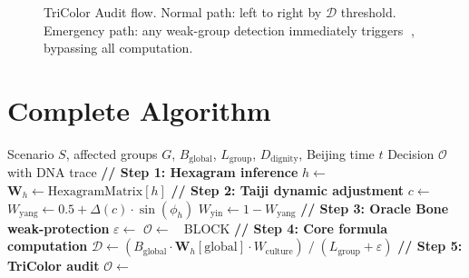 \documentclass[conference]{IEEEtran}
\newcommand{\LH}{\textcolor{dragonRed}{\textbf{龙魂}}}
\begin{document}
\begin{figure}[t]
\centering
{}
\caption{TriColor Audit flow.
  Normal path: left to right by $\mathcal{D}$ threshold.
  Emergency path: any weak-group detection immediately
  triggers 🔴, bypassing all computation.}
\label{fig:tricolor}
\end{figure}

\section{Complete Algorithm}
\label{sec:algorithm}

\begin{algorithm}[t]
\caption{\LH{} Dynamic Weight Decision Algorithm v2.0}
\label{alg:main}
\begin{algorithmic}[1]
\Require Scenario $S$, affected groups $G$,
  $B_{\text{global}}$, $L_{\text{group}}$,
  $D_{\text{dignity}}$, Beijing time $t$
\Ensure Decision $\mathcal{O}$ with DNA trace
\State \textbf{// Step 1: Hexagram inference}
\State $h \gets$ 
\State $\mathbf{W}_h \gets \text{HexagramMatrix}[h]$
\State \textbf{// Step 2: Taiji dynamic adjustment}
\State $c \gets$ 
\State $W_{\text{yang}} \gets 0.5
  + \Delta(c)\cdot\sin(\phi_h)$
\State $W_{\text{yin}}  \gets 1 - W_{\text{yang}}$
\State \textbf{// Step 3: Oracle Bone weak-protection}
\State $\varepsilon \gets$
\If{$\varepsilon = +\infty$}
  \State $\mathcal{O} \gets$ 🔴 BLOCK
  \State \Return {}
\EndIf
\State \textbf{// Step 4: Core formula computation}
\State $\mathcal{D} \gets
  (B_{\text{global}} \cdot \mathbf{W}_h[\text{global}]
   \cdot W_{\text{culture}})
  \;/\;
  (L_{\text{group}} + \varepsilon)$
\State \textbf{// Step 5: TriColor audit}
\State $\mathcal{O} \gets$
\State \Return {}
\end{algorithmic}
\end{algorithm}
\end{document}

